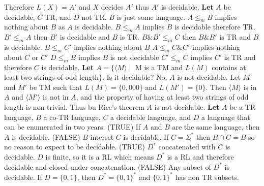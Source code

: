 \documentclass[9pt]{article}
\begin{document}
\begin{multicols*}{2}
    Therefore $L(X)=A'$ and $X$ decides $A'$ thus $A'$ is decidable.\newline
    \textbf{Let} $A$ be decidable, $C$ TR, and $D$ not TR. $B$ is just some language.\newline
    $A\leq_m B$ implies nothing about $B$ as $A$ is decidable.\newline
    $B\leq_m A$ implies $B$ is decidable therefore TR.\newline
    $B'\leq_m A$ then $B'$ is decidable and $B$ is TR.\newline
    $B \& B' \leq_m C$ then $B \& B'$ is TR and $B$ is decidable.\newline
    $B\leq_m C'$ implies nothing about $B$\newline
    $A\leq_mC\&C'$ implies nothing about $C$ or $C'$\newline
    $D\leq_m B$ implies $B$ is not decidable\newline
    $C'\leq_m C$ implies $C'$ is TR and therefore $C$ is decidable.\newline
    \textbf{Let} $A=\{\langle M \rangle \mid $ M is a TM and $L(M)$ contains at least two strings of odd length$\}$. Is it decidable?\newline
    No, $A$ is not decidable. Let $M$ and $M'$ be TM such that $L(M)=\{0,000\}$ and $L(M')=\{0\}$. Then $\langle M \rangle$ is in $A$ and $\langle M' \rangle$ is not in $A$, and the property of having at least two strings of odd length is non-trivial. Thus bu Rice's theorem $A$ is not decidable.\newline
    \textbf{Let} $A$ be a TR language, $B$ a co-TR language, $C$ a decidable language, and $D$ a language that can be enumerated in two years.\newline
    (TRUE) If $A$ and $B$ are the same language, then $A$ is decidable.\newline
    (FALSE) $B$ interset $C$ is decidable. If $C=\Sigma^*$ then $B\cap C = B$ so no reason to expect to be decidable.\newline
    (TRUE) $D^*$ concatenated with $C$ is decidable. $D$ is finite, so it is a RL which means $D^*$ is a RL and therefore decidable and closed under concatenation.\newline
    (FALSE) Any subset of $D^*$ is decidable. If $D=\{0,1\}$, then $D^*=\{0,1\}^*$ and $\{0,1\}^*$ has non TR subsets.
\end{multicols*}
\end{document}
